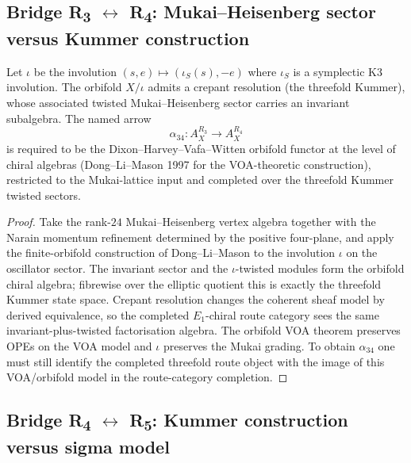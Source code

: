 \subsection{\texorpdfstring{Bridge R\textsubscript{3} $\leftrightarrow$ R\textsubscript{4}: Mukai--Heisenberg sector versus Kummer construction}{Bridge R3 <-> R4: Mukai--Heisenberg sector versus Kummer construction}}

\begin{proposition}
\label{prop:route3-route4-bridge}
Let $\iota$ be the involution $(s, e) \mapsto (\iota_S(s), -e)$ where $\iota_S$ is a symplectic K3 involution. The orbifold $X/\iota$ admits a crepant resolution (the threefold Kummer), whose associated twisted Mukai--Heisenberg sector carries an invariant subalgebra. The named arrow
\[
 \alpha_{34} \colon A_X^{R_3} \longrightarrow A_X^{R_4}
\]
is required to be the Dixon--Harvey--Vafa--Witten orbifold functor at the level of
chiral algebras (Dong--Li--Mason 1997 for the VOA-theoretic
construction), restricted to the Mukai-lattice input and completed over
the threefold Kummer twisted sectors.
\end{proposition}

\begin{proof}
Take the rank-$24$ Mukai--Heisenberg vertex algebra together with the
Narain momentum refinement determined by the positive four-plane, and
apply the finite-orbifold construction of Dong--Li--Mason to the
involution \(\iota\) on the oscillator sector. The invariant sector and
the \(\iota\)-twisted modules form the orbifold chiral algebra;
fibrewise over the elliptic quotient this is exactly the threefold
Kummer state space. Crepant resolution changes the
coherent sheaf model by derived equivalence, so the completed
\(E_1\)-chiral route category sees the same invariant-plus-twisted
factorisation algebra. The orbifold VOA theorem preserves OPEs on the
VOA model and \(\iota\) preserves the Mukai grading. To obtain
\(\alpha_{34}\) one must still identify the completed threefold route
object with the image of this VOA/orbifold model in the route-category
completion.
\end{proof}

\subsection{\texorpdfstring{Bridge R\textsubscript{4} $\leftrightarrow$ R\textsubscript{5}: Kummer construction versus sigma model}{Bridge R4 <-> R5: Kummer construction versus sigma model}}


